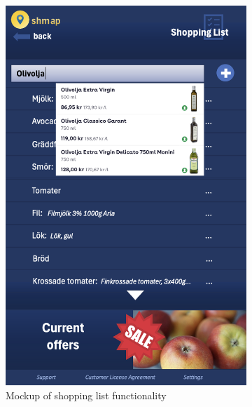 \documentclass[titlepage]{article}
\begin{document}
\begin{figure}[h!]
    \centering
    \begin{subfigure}[b]{0.3\linewidth}
        \includegraphics[width=\textwidth]{ShopList.png}
        \caption{Mockup of shopping list functionality}
      \end{subfigure}
      \begin{subfigure}[b]{0.3\linewidth}

\end{subfigure}
\end{figure}
\end{document}
